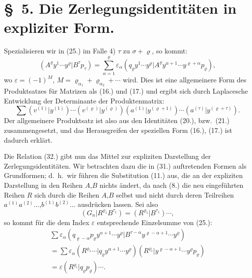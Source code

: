 \documentclass[12pt,a4paper]{article}
\begin{document}
\section*{\S\ 5. Die Zerlegungsidentitäten in expliziter Form.}

Spezialisieren wir in (25.) im Falle 4) $\tau$ zu $\sigma + \varrho$, so kommt:
\begin{equation}\tag{32}
(A^{\varrho} y^{1} \cdots y^{\varrho} | B^{\tau} p_{\tau}) = \sum_{\alpha=1}^{\varrho} \varepsilon_{\alpha} (q_{\varrho} y^{1} \cdots y^{\varrho} | A^{\varrho} y^{\alpha+1} \cdots y^{\varrho+\alpha} p_{\varrho}),
\end{equation}
wo $\varepsilon = (-1)^{M}$, $M = \varrho_{\alpha_{1}} + \varrho_{\alpha_{2}} + \cdots$ wird. Dies ist eine allgemeinere Form des Produktsatzes für Matrizen als (16.) und (17.) und ergibt sich durch Laplacesche Entwicklung der Determinante der Produktenmatrix:
\begin{equation*}
\sum (v^{(1)} | y^{(1)}) \cdots (v^{(\varrho)} | y^{(\varrho)}) (a^{(1)} | y^{(\varrho+1)}) \cdots (a^{(\tau)} | y^{(\varrho+\tau)}).
\end{equation*}
Der allgemeinere Produktsatz ist also aus den Identitäten (20.), bzw.\ (21.) zusammengesetzt, und das Herausgreifen der speziellen Form (16.), (17.) ist dadurch erklärt.

Die Relation (32.) gibt nun das Mittel zur expliziten Darstellung der Zerlegungsidentitäten. Wir betrachten dazu die in (31.) auftretenden Formen als Grundformen; d.\ h.\ wir führen die Substitution (11.) aus, die an der expliziten Darstellung in den Reihen $A$,$B$ nichts ändert, da nach (8.) die neu eingeführten Reihen $R$ sich durch die Reihen $A$,$B$ selbst und nicht durch deren Teilreihen $a^{(1)} a^{(2)} \ldots$,$b^{(1)} b^{(2)} \ldots$ ausdrücken lassen. Sei also
\begin{equation*}
(G_{n} | R^{\varrho_{1}} B^{\tau_{1}}) = (R^{\varrho_{1}} | B^{\tau_{1}}) \cdots,
\end{equation*}
so kommt für die dem Index $\varepsilon$ entsprechende Einzelsumme von (25.):
\begin{multline}\tag{34}
\sum \varepsilon_{\alpha} (q_{\varrho-\alpha} p_{\varrho} y^{\alpha+1} \cdots y^{\varrho} | B^{\tau-\alpha} y^{\varrho-\alpha+1} \cdots y^{\varrho}) \\ = \sum \varepsilon_{\alpha} (R^{\varrho_{1}} \cdots | q_{\varrho} y^{\alpha+1} \cdots y^{\varrho}) (R^{\varrho_{i}} | y^{\varrho-\alpha+1} \cdots y^{\varrho} p_{\varrho}) \\ = \varepsilon (R^{\varrho_{i}} | q_{\varrho} p_{\varrho}) \cdots.
\end{multline}
\end{document}
